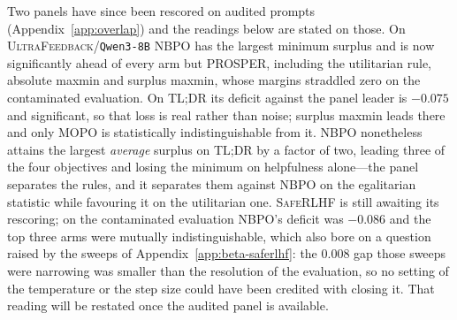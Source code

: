 \documentclass{article}
\theoremstyle{remark}
\theoremstyle{plain}
\newcommand{\NBPO}{\textsc{NBPO}}
\begin{document}
Two panels have since been rescored on audited prompts (Appendix~\ref{app:overlap}) and the readings
below are stated on those. On \textsc{UltraFeedback}/\texttt{Qwen3-8B} \NBPO{} has the largest minimum
surplus and is now significantly ahead of every arm but PROSPER, including the utilitarian rule, absolute
maxmin and surplus maxmin, whose margins straddled zero on the contaminated evaluation. On \textsc{TL;DR}
its deficit against the panel leader is $-0.075$ and significant, so that loss is real rather than noise;
surplus maxmin leads there and only MOPO is statistically indistinguishable from it. \NBPO{} nonetheless
attains the largest \emph{average} surplus on \textsc{TL;DR} by a factor of two, leading three of the four
objectives and losing the minimum on helpfulness alone---the panel separates the rules, and it separates
them against \NBPO{} on the egalitarian statistic while favouring it on the utilitarian one.
\textsc{SafeRLHF} is still awaiting its rescoring; on the contaminated evaluation \NBPO{}'s deficit was
$-0.086$ and the top three arms were mutually indistinguishable, which also bore on a question raised by
the sweeps of Appendix~\ref{app:beta-saferlhf}: the $0.008$ gap those sweeps were narrowing was smaller
than the resolution of the evaluation, so no setting of the temperature or the step size could have been
credited with closing it. That reading will be restated once the audited panel is available.
\end{document}
